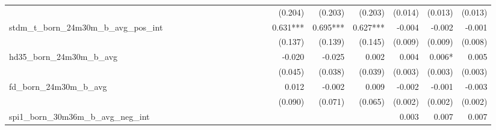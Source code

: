 \begin{tabular}{lrrrrrrrrrrrrrrrrrr}
                                            &              &              &              &              &              &              &              &              &               &              &              &               &      (0.204) &      (0.203) &       (0.203) &      (0.014) &      (0.013) &       (0.013) \\ 
stdm\_t\_born\_24m30m\_b\_avg\_pos\_int     &              &              &              &              &              &              &              &              &               &              &              &               &     0.631*** &     0.695*** &      0.627*** &       -0.004 &       -0.002 &        -0.001 \\ 
                                            &              &              &              &              &              &              &              &              &               &              &              &               &      (0.137) &      (0.139) &       (0.145) &      (0.009) &      (0.009) &       (0.008) \\ 
hd35\_born\_24m30m\_b\_avg                  &              &              &              &              &              &              &              &              &               &              &              &               &       -0.020 &       -0.025 &         0.002 &        0.004 &       0.006* &         0.005 \\ 
                                            &              &              &              &              &              &              &              &              &               &              &              &               &      (0.045) &      (0.038) &       (0.039) &      (0.003) &      (0.003) &       (0.003) \\ 
fd\_born\_24m30m\_b\_avg                    &              &              &              &              &              &              &              &              &               &              &              &               &        0.012 &       -0.002 &         0.009 &       -0.002 &       -0.001 &        -0.003 \\ 
                                            &              &              &              &              &              &              &              &              &               &              &              &               &      (0.090) &      (0.071) &       (0.065) &      (0.002) &      (0.002) &       (0.002) \\ 
spi1\_born\_30m36m\_b\_avg\_neg\_int        &              &              &              &              &              &              &              &              &               &              &              &               &              &              &               &        0.003 &        0.007 &         0.007 \\ 

\end{tabular}
